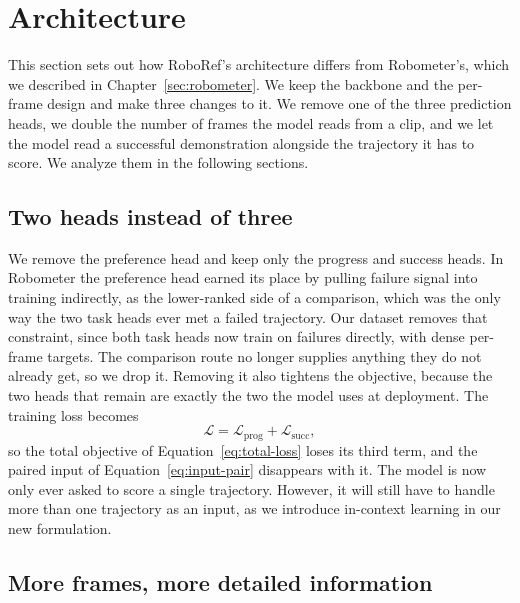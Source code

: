 \section{Architecture}
\label{sec:method-arch}

This section sets out how RoboRef's architecture differs from Robometer's, which we described in Chapter~\ref{sec:robometer}. We keep the backbone and the per-frame design and make three changes to it. We remove one of the three prediction heads, we double the number of frames the model reads from a clip, and we let the model read a successful demonstration alongside the trajectory it has to score. We analyze them in the following sections.

\subsection{Two heads instead of three}

We remove the preference head and keep only the progress and success heads. In Robometer the preference head earned its place by pulling failure signal into training indirectly, as the lower-ranked side of a comparison, which was the only way the two task heads ever met a failed trajectory. Our dataset removes that constraint, since both task heads now train on failures directly, with dense per-frame targets. The comparison route no longer supplies anything they do not already get, so we drop it. Removing it also tightens the objective, because the two heads that remain are exactly the two the model uses at deployment. The training loss becomes
\begin{equation}
\mathcal{L} = \mathcal{L}_{\mathrm{prog}} + \mathcal{L}_{\mathrm{succ}} ,
\end{equation}
so the total objective of Equation~\ref{eq:total-loss} loses its third term, and the paired input of Equation~\ref{eq:input-pair} disappears with it. The model is now only ever asked to score a single trajectory. However, it will still have to handle more than one trajectory as an input, as we introduce in-context learning in our new formulation.

\subsection{More frames, more detailed information}

